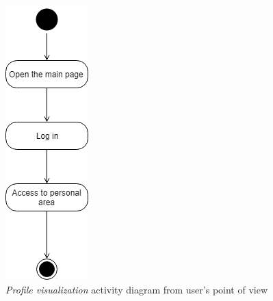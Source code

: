 \begin{figure}[H]
\begin{center}
  \includegraphics{img/activity/ProfileVisualization.png}
  \hspace{0.05\linewidth}
  \centering
  \caption{\textit{Profile visualization} activity diagram from user's point of view}
  \label{img:profileVisualizationActivityDiagram}
\end{center}
\end{figure}

